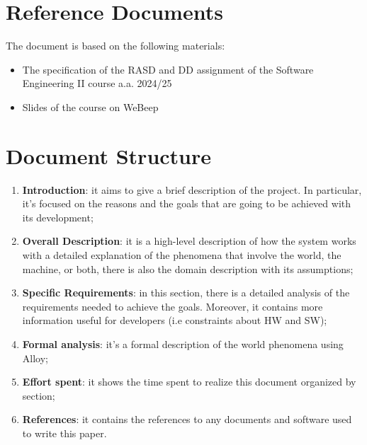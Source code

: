\section{Reference Documents}

The document is based on the following materials:

\begin{itemize}
    \item The specification of the RASD and DD assignment of the Software Engineering II course a.a. 2024/25 
    \item Slides of the course on WeBeep
\end{itemize}


\section{Document Structure}

\begin{enumerate}
    \item  \textbf{Introduction}: it aims to give a brief description of the project. In particular, it’s focused on the reasons and the goals that are going to be achieved with its development;
 
    \item \textbf{Overall Description}: it is a high-level description of how the system works with a detailed explanation of the phenomena that involve the world, the machine, or both, there is also the domain description with its assumptions;
 
    \item \textbf{Specific Requirements}: in this section, there is a detailed analysis of the requirements needed to achieve the goals. Moreover, it contains more information useful for developers (i.e constraints about HW and SW);
    
    \item \textbf{Formal analysis}: it’s a formal description of the world phenomena using Alloy;

    \item  \textbf{Effort spent}: it shows the time spent to realize this document organized by section;

    \item  \textbf{References}: it contains the references to any documents and software used to write this paper.
    
\end{enumerate}